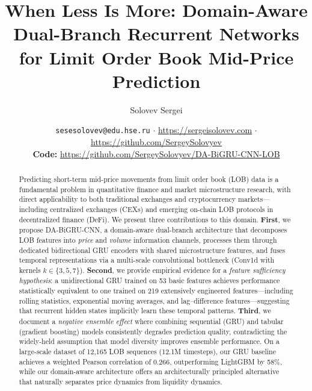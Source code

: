 \documentclass[11pt,a4paper]{article}
\newcommand{\methodname}{DA-BiGRU-CNN}
\begin{document}
\title{%
\textbf{When Less Is More: Domain-Aware Dual-Branch Recurrent Networks\\
for Limit Order Book Mid-Price Prediction}
}

\author{Solovev Sergei}

\date{\small \texttt{sesesolovev@edu.hse.ru} \quad $\cdot$ \quad \url{https://sergeisolovev.com} \quad $\cdot$ \quad \url{https://github.com/SergeySolovyev}\\[0.3em]
\textbf{Code:} \url{https://github.com/SergeySolovyev/DA-BiGRU-CNN-LOB}}
\maketitle

\begin{abstract}
Predicting short-term mid-price movements from limit order book (LOB) data is a fundamental problem in quantitative finance and market microstructure research, with direct applicability to both traditional exchanges and cryptocurrency markets---including centralized exchanges (CEXs) and emerging on-chain LOB protocols in decentralized finance (DeFi). We present three contributions to this domain. \textbf{First}, we propose \methodname{}, a domain-aware dual-branch architecture that decomposes LOB features into \emph{price} and \emph{volume} information channels, processes them through dedicated bidirectional GRU encoders with shared microstructure features, and fuses temporal representations via a multi-scale convolutional bottleneck (Conv1d with kernels $k \in \{3,5,7\}$). \textbf{Second}, we provide empirical evidence for a \emph{feature sufficiency hypothesis}: a unidirectional GRU trained on 53 basic features achieves performance statistically equivalent to one trained on 219 extensively engineered features---including rolling statistics, exponential moving averages, and lag--difference features---suggesting that recurrent hidden states implicitly learn these temporal patterns. \textbf{Third}, we document a \emph{negative ensemble effect} where combining sequential (GRU) and tabular (gradient boosting) models consistently degrades prediction quality, contradicting the widely-held assumption that model diversity improves ensemble performance. On a large-scale dataset of 12{,}165 LOB sequences (12.1M timesteps), our GRU baseline achieves a weighted Pearson correlation of 0.266, outperforming LightGBM by 58\%, while our domain-aware architecture offers an architecturally principled alternative that naturally separates price dynamics from liquidity dynamics.
\end{abstract}
\end{document}
